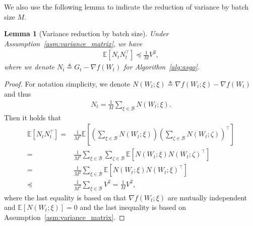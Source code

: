 \documentclass{article}
\newtheorem{lemma}{Lemma}
\theoremstyle{remark}
\newcommand{\EE}{\mathbb{E}}
\newcommand{\cB}{\mathcal{B}}
\begin{document}
We also use the following lemma to indicate the reduction of variance by batch size $M$.
\begin{lemma}[Variance reduction by batch size]\label{lem:varaince_reduce_batch}
    Under Assumption~\ref{asm:variance_matrix}, we have
    \begin{align*}
        \EE\left[ N_t N_t^\top \right] \preceq \frac{1}{M} V^2,
    \end{align*}
    where we denote $N_t \triangleq G_t - \nabla f(W_t)$ for Algorithm~\ref{alg:asgo}.
\end{lemma}
\begin{proof}
    For notation simplicity, we denote $N(W_t;\xi) \triangleq \nabla f(W_t;\xi) - \nabla f(W_t)$ and thus
    \begin{align*}
        N_t = \frac{1}{M} \sum_{\xi \in \cB} N(W_t;\xi).
    \end{align*}
    Then it holds that
    \begin{align*}
        \EE\left[ N_t N_t^\top \right] =& \frac{1}{M^2} \EE\left[ \left( \sum_{\xi \in \cB} N(W_t;\xi) \right) \left( \sum_{\zeta \in \cB} N(W_t;\zeta) \right)^\top \right] \\
        =&
        \frac{1}{M^2} \sum_{\xi \in \cB} \sum_{\zeta \in \cB} \EE\left[ N(W_t;\xi) N(W_t;\zeta)^\top \right] \\
        =& \frac{1}{M^2} \sum_{\xi \in \cB} \EE\left[ N(W_t;\xi) N(W_t;\xi)^\top \right] \\
        \preceq& \frac{1}{M^2} \sum_{\xi \in \cB} V^2 = \frac{1}{M} V^2,
    \end{align*}
    where the last equality is based on that $\nabla f(W_t;\xi)$ are mutually independent and $\EE[N(W_t;\xi)]=0$ and the last inequality is based on Assumption~\ref{asm:variance_matrix}.
\end{proof}
\end{document}
